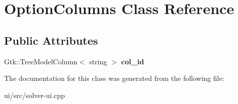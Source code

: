 \hypertarget{classOptionColumns}{\section{\-Option\-Columns \-Class \-Reference}
\label{classOptionColumns}
}
\subsection*{\-Public \-Attributes}
\begin{DoxyCompactItemize}
\item 
\hypertarget{classOptionColumns_a95f0d7286b169d66b107a5bec36e2c7a}{\-Gtk\-::\-Tree\-Model\-Column$<$ string $>$ {\bfseries col\-\_\-id}}\label{classOptionColumns_a95f0d7286b169d66b107a5bec36e2c7a}

\end{DoxyCompactItemize}


\-The documentation for this class was generated from the following file\-:\begin{DoxyCompactItemize}
\item 
ui/src/solver-\/ui.\-cpp\end{DoxyCompactItemize}

